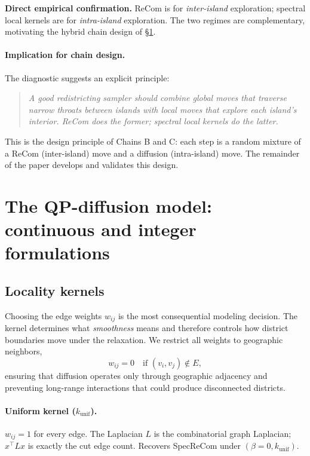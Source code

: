 \documentclass[11pt]{article}
\begin{document}
\textbf{Direct empirical confirmation.} ReCom is for \emph{inter-island}
exploration; spectral local kernels are for \emph{intra-island}
exploration. The two regimes are complementary, motivating the hybrid
chain design of \S\ref{sec:model}.

\paragraph{Implication for chain design.}\label{sec:fiber-implication}

The diagnostic suggests an explicit principle:

\begin{quote}
\itshape A good redistricting sampler should combine global moves that
traverse narrow throats between islands with local moves that explore
each island's interior. ReCom does the former; spectral local kernels
do the latter.
\end{quote}

This is the design principle of Chains B and C: each step is a random
mixture of a ReCom (inter-island) move and a diffusion (intra-island)
move. The remainder of the paper develops and validates this design.

\section{The QP-diffusion model: continuous and integer formulations}\label{sec:model}

\subsection{Locality kernels}\label{sec:kernels}

Choosing the edge weights $w_{ij}$ is the most consequential modeling
decision. The kernel determines what \emph{smoothness} means and
therefore controls how district boundaries move under the relaxation.
We restrict all weights to geographic neighbors,
\begin{equation}\label{eq:kernel-local}
  w_{ij} = 0 \quad \text{if } (v_i, v_j) \notin E,
\end{equation}
ensuring that diffusion operates only through geographic adjacency and
preventing long-range interactions that could produce disconnected
districts.

\paragraph{Uniform kernel ($k_{\mathrm{unif}}$).} $w_{ij} = 1$ for
every edge. The Laplacian $L$ is the combinatorial graph Laplacian;
$x^\top L x$ is exactly the cut edge count. Recovers SpecReCom
under $(\beta = 0, k_{\mathrm{unif}})$.
\end{document}

